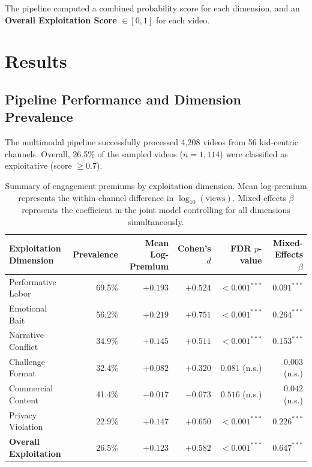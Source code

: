 \documentclass[letterpaper]{article} %
\begin{document}
The pipeline computed a combined probability score for each dimension, and an \textbf{Overall Exploitation Score} $\in [0, 1]$ for each video.

\section{Results}

\subsection{Pipeline Performance and Dimension Prevalence}

The multimodal pipeline successfully processed 4,208 videos from 56 kid-centric channels. Overall, 26.5\% of the sampled videos ($n=1,114$) were classified as exploitative (score $\ge 0.7$).

\begin{table}[t]
\centering
\begin{tabular}{lrrrrr}
\toprule
\textbf{Exploitation Dimension} & \textbf{Prevalence} & \textbf{Mean Log-Premium} & \textbf{Cohen's $d$} & \textbf{FDR $p$-value} & \textbf{Mixed-Effects $\beta$} \\
\midrule
Performative Labor & 69.5\% & $+0.193$ & $+0.524$ & $<0.001^{***}$ & $0.091^{***}$ \\
Emotional Bait & 56.2\% & $+0.219$ & $+0.751$ & $<0.001^{***}$ & $0.264^{***}$ \\
Narrative Conflict & 34.9\% & $+0.145$ & $+0.511$ & $<0.001^{***}$ & $0.153^{***}$ \\
Challenge Format & 32.4\% & $+0.082$ & $+0.320$ & $0.081$ (n.s.) & $0.003$ (n.s.) \\
Commercial Content & 41.4\% & $-0.017$ & $-0.073$ & $0.516$ (n.s.) & $0.042$ (n.s.) \\
Privacy Violation & 22.9\% & $+0.147$ & $+0.650$ & $<0.001^{***}$ & $0.226^{***}$ \\
\midrule
\textbf{Overall Exploitation} & 26.5\% & $+0.123$ & $+0.582$ & $<0.001^{***}$ & $0.647^{***}$ \\
\bottomrule
\end{tabular}
\caption{Summary of engagement premiums by exploitation dimension. Mean log-premium represents the within-channel difference in $\log_{10}(\text{views})$. Mixed-effects $\beta$ represents the coefficient in the joint model controlling for all dimensions simultaneously.}
\label{tab:main_results}
\end{table}
\end{document}
